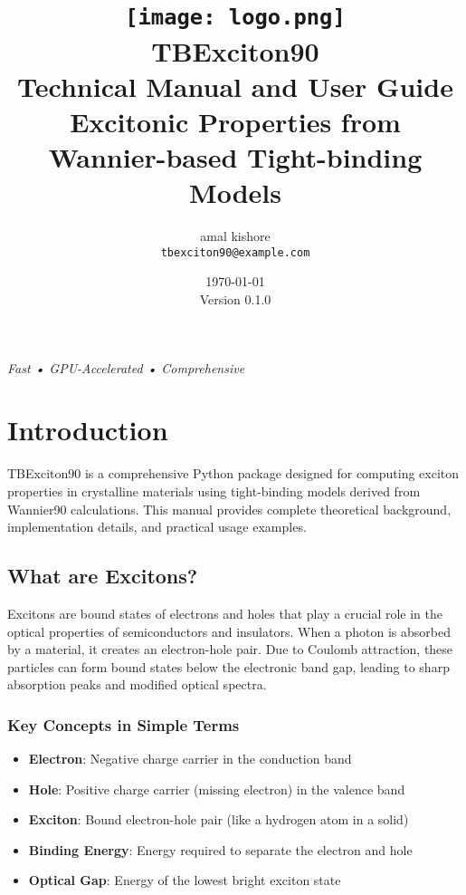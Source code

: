 \documentclass[11pt,a4paper]{article}
\title{
    \vspace{-2cm}
    \texttt{[image: logo.png]}\\[1cm]
    {\Huge \textbf{TBExciton90}}\\[0.5cm]
    {\Large Technical Manual and User Guide}\\[0.3cm]
    {\large Excitonic Properties from Wannier-based Tight-binding Models}
}
\author{
    amal kishore\\
    \texttt{tbexciton90@example.com}
}
\date{\today \\ Version 0.1.0}
\begin{document}
\maketitle
\thispagestyle{empty}

\vfill
\begin{center}
\textit{Fast • GPU-Accelerated • Comprehensive}
\end{center}

\newpage

\tableofcontents
\newpage

\section{Introduction}

TBExciton90 is a comprehensive Python package designed for computing exciton properties in crystalline materials using tight-binding models derived from Wannier90 calculations. This manual provides complete theoretical background, implementation details, and practical usage examples.

\subsection{What are Excitons?}

Excitons are bound states of electrons and holes that play a crucial role in the optical properties of semiconductors and insulators. When a photon is absorbed by a material, it creates an electron-hole pair. Due to Coulomb attraction, these particles can form bound states below the electronic band gap, leading to sharp absorption peaks and modified optical spectra.

\subsubsection{Key Concepts in Simple Terms}

\begin{itemize}
    \item \textbf{Electron}: Negative charge carrier in the conduction band
    \item \textbf{Hole}: Positive charge carrier (missing electron) in the valence band
    \item \textbf{Exciton}: Bound electron-hole pair (like a hydrogen atom in a solid)
    \item \textbf{Binding Energy}: Energy required to separate the electron and hole
    \item \textbf{Optical Gap}: Energy of the lowest bright exciton state
\end{itemize}
\end{document}
